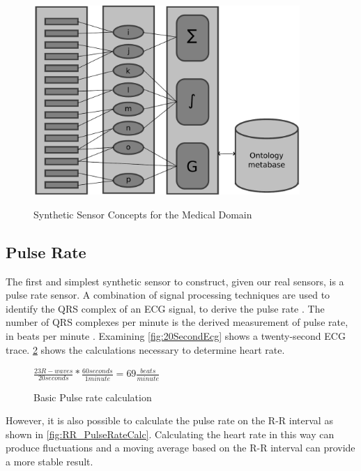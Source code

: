 \begin{figure}
	\begin{center}
		\label{fig:SyntheticSensor}
		\includegraphics[scale=1,width=0.9\textwidth]{Images/syntheticSensor.pdf} 
		\caption{Synthetic Sensor Concepts for the Medical Domain}
	\end{center}
\end{figure}

\subsection{Pulse Rate}
\label{subsec:PulseRate}
The first and simplest synthetic sensor to construct, given our real sensors, is a pulse rate sensor. A combination of signal processing techniques are used to identify the QRS complex of an ECG signal, to derive the pulse rate  \cite{Chaitanya2011}. The number of QRS complexes per minute is the derived measurement of pulse rate, in beats per minute \cite{Scully2012}. Examining \cref{fig:20SecondEcg} shows a twenty-second ECG trace. \cref{fig:PulseRateCalc} shows the calculations necessary to determine heart rate.
\begin{figure}
	\begin{center}
		\label{fig:PulseRateCalc}
		$\frac{23 R-waves}{20 seconds}*\frac{60 seconds}{1 minute}=69 \frac{beats}{minute}$
		\caption{Basic Pulse rate calculation}
	\end{center}
\end{figure}

However, it is also possible to calculate the pulse rate on the R-R interval as shown in \cref{fig:RR_PulseRateCalc}. Calculating the heart rate in this way can produce fluctuations and a moving average based on the R-R interval can provide a more stable result.

